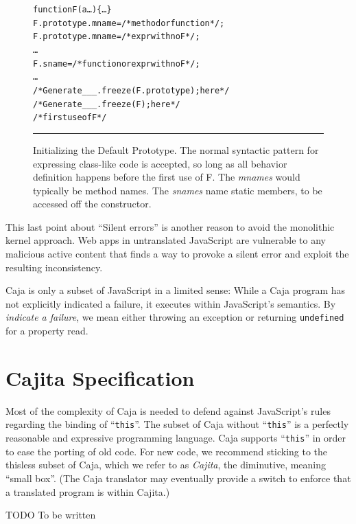 \documentclass[letterpaper,twocolumn,10pt]{article}
\newcommand{\code}[1]{{\tt {#1}}}              %
\begin{document}
\begin{figure}[t!]
\begin{alltt}
function F(a\ldots)\{\ldots\}
F.prototype.mname = /*method or function*/;
F.prototype.mname = /*expr with no F*/;
\ldots
F.sname = /*function or expr with no F*/;
\ldots
/*Generate \_\_\_.freeze(F.prototype); here*/
/*Generate \_\_\_.freeze(F); here*/
/*first use of F*/
\end{alltt}

\caption[Initializing the Default Prototype]{Initializing the Default
Prototype. The normal syntactic pattern for expressing class-like code is
accepted, so long as all behavior definition happens before the first use of
F. The \emph{mnames} would typically be method names. The \emph{snames} name
static members, to be accessed off the constructor. \\ } \hrule
\label{fig:use-proto}
\end{figure}

This last point about ``Silent errors'' is another reason to avoid the 
monolithic kernel approach. Web apps in untranslated JavaScript are 
vulnerable to any malicious active content that finds a way to provoke a 
silent error and exploit the resulting inconsistency.

Caja is only a subset of JavaScript in a limited sense: While a Caja program 
has not explicitly indicated a failure, it executes within JavaScript's 
semantics. By \emph{indicate a failure}, we mean either throwing an exception 
or returning \code{undefined} for a property read. 

\section{Cajita Specification}
\label{sec:cajita-spec}


Most of the complexity of Caja is needed to defend against JavaScript's rules 
regarding the binding of ``\code{this}''. The subset of Caja without 
``\code{this}'' is a perfectly reasonable and expressive programming 
language. Caja supports ``\code{this}'' in order to ease the porting of old 
code. For new code, we recommend sticking to the thisless subset of Caja, 
which we refer to as \emph{Cajita}, the diminutive, meaning ``small box''. 
(The Caja translator may eventually provide a switch to enforce that a 
translated program is within Cajita.)

TODO To be written
\end{document}
